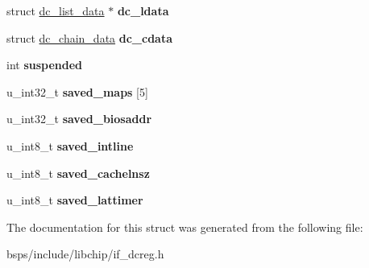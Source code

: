 \begin{DoxyCompactItemize}
struct \mbox{\hyperlink{structdc__list__data}{dc\+\_\+list\+\_\+data}} $\ast$ {\bfseries dc\+\_\+ldata}
\item 
\mbox{\label{structdc__softc_acee665ec7d4d2a50e5f9889e6123cfb2}} 
struct \mbox{\hyperlink{structdc__chain__data}{dc\+\_\+chain\+\_\+data}} {\bfseries dc\+\_\+cdata}
\item 
\mbox{\label{structdc__softc_a2782f8a93ba5e04578aba9acf4a685a0}} 
int {\bfseries suspended}
\item 
\mbox{\label{structdc__softc_aa8a41c2fe2d3c3af6de9d8e3f2b146b9}} 
u\+\_\+int32\+\_\+t {\bfseries saved\+\_\+maps} \mbox{[}5\mbox{]}
\item 
\mbox{\label{structdc__softc_aa90a01675f0dcfa241cd8b57011922b4}} 
u\+\_\+int32\+\_\+t {\bfseries saved\+\_\+biosaddr}
\item 
\mbox{\label{structdc__softc_a68a0a7cf61b8303e0a389b5c5da21bd9}} 
u\+\_\+int8\+\_\+t {\bfseries saved\+\_\+intline}
\item 
\mbox{\label{structdc__softc_a32cd93fd6839844a3b9123e25c580c7d}} 
u\+\_\+int8\+\_\+t {\bfseries saved\+\_\+cachelnsz}
\item 
\mbox{\label{structdc__softc_a34f968112a64a6b1fa591dfc6d253d63}} 
u\+\_\+int8\+\_\+t {\bfseries saved\+\_\+lattimer}
\end{DoxyCompactItemize}


The documentation for this struct was generated from the following file\+:\begin{DoxyCompactItemize}
\item 
bsps/include/libchip/if\+\_\+dcreg.\+h\end{DoxyCompactItemize}
